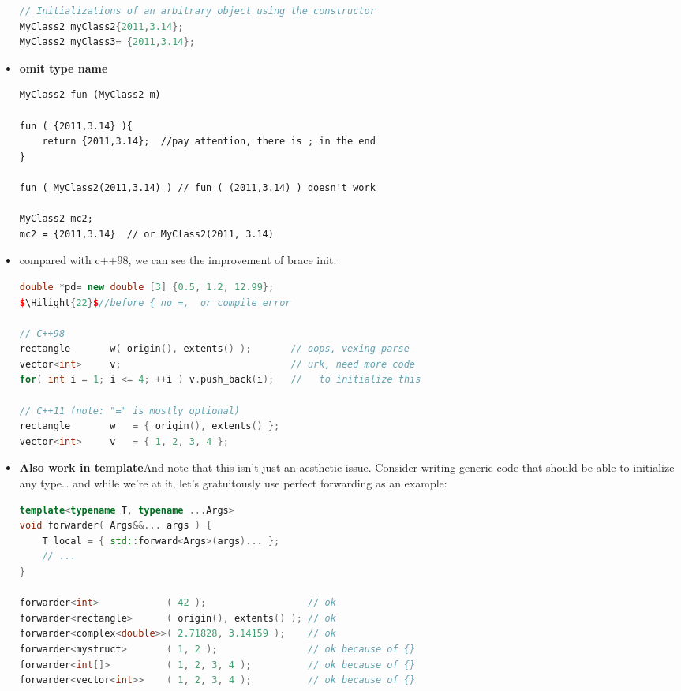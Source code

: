\documentclass[a4paper,12pt,twoside]{book}
\newcommand{\Hilight}[1]{\makebox[0pt][l]{\color{yellow}\rule[-3pt]{#1em}{11pt}}}
\begin{document}
\begin{itemize}
\begin{lstlisting}[frame=single, language=c++,mathescape=true]
// Initializations of an arbitrary object using the constructor
MyClass2 myClass2{2011,3.14};     
MyClass2 myClass3= {2011,3.14};   
\end{lstlisting}
	
\item \textbf{omit type name}
	
\begin{lstlisting}
MyClass2 fun (MyClass2 m) 
	
fun ( {2011,3.14} ){
	return {2011,3.14};  //pay attention, there is ; in the end
}
	
fun ( MyClass2(2011,3.14) ) // fun ( (2011,3.14) ) doesn't work

MyClass2 mc2;
mc2 = {2011,3.14}  // or MyClass2(2011, 3.14)
	\end{lstlisting}
	
\item compared with c++98, we can see the improvement of brace init.
\begin{lstlisting}[frame=single, language=c++,mathescape=true]
double *pd= new double [3] {0.5, 1.2, 12.99}; 
$\Hilight{22}$//before { no =,  or compile error
	
// C++98 
rectangle       w( origin(), extents() );       // oops, vexing parse 
vector<int>     v;                              // urk, need more code
for( int i = 1; i <= 4; ++i ) v.push_back(i);   //   to initialize this
	
// C++11 (note: "=" is mostly optional)
rectangle       w   = { origin(), extents() }; 
vector<int>     v   = { 1, 2, 3, 4 };
\end{lstlisting}
	
\item \textbf{Also work in template}And note that this isn’t just an aesthetic issue. Consider writing generic code that should be able to initialize any type… and while we’re at it, let’s gratuitously use perfect forwarding as an example:
	
\begin{lstlisting}[frame=single, language=c++,mathescape=true]
template<typename T, typename ...Args>
void forwarder( Args&&... args ) {
	T local = { std::forward<Args>(args)... };
	// ...
}

forwarder<int>            ( 42 );                  // ok
forwarder<rectangle>      ( origin(), extents() ); // ok
forwarder<complex<double>>( 2.71828, 3.14159 );    // ok
forwarder<mystruct>       ( 1, 2 );                // ok because of {}
forwarder<int[]>          ( 1, 2, 3, 4 );          // ok because of {}
forwarder<vector<int>>    ( 1, 2, 3, 4 );          // ok because of {}
\end{lstlisting}
	

\end{itemize}
\end{document}
